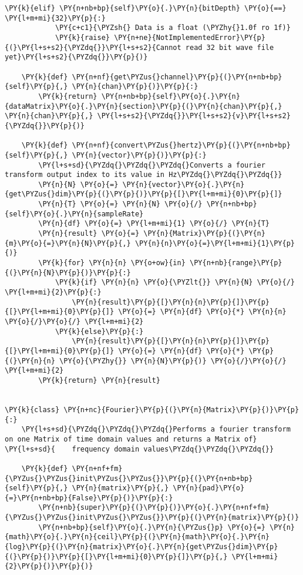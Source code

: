 \begin{Verbatim}[commandchars=\\\{\}]
        \PY{k}{elif} \PY{n+nb+bp}{self}\PY{o}{.}\PY{n}{bitDepth} \PY{o}{==} \PY{l+m+mi}{32}\PY{p}{:}
            \PY{c+c1}{\PYZsh{} Data is a float (\PYZhy{}1.0f ro 1f)}
            \PY{k}{raise} \PY{n+ne}{NotImplementedError}\PY{p}{(}\PY{l+s+s2}{\PYZdq{}}\PY{l+s+s2}{Cannot read 32 bit wave file yet}\PY{l+s+s2}{\PYZdq{}}\PY{p}{)}

    \PY{k}{def} \PY{n+nf}{get\PYZus{}channel}\PY{p}{(}\PY{n+nb+bp}{self}\PY{p}{,} \PY{n}{chan}\PY{p}{)}\PY{p}{:}
        \PY{k}{return} \PY{n+nb+bp}{self}\PY{o}{.}\PY{n}{dataMatrix}\PY{o}{.}\PY{n}{section}\PY{p}{(}\PY{n}{chan}\PY{p}{,} \PY{n}{chan}\PY{p}{,} \PY{l+s+s2}{\PYZdq{}}\PY{l+s+s2}{v}\PY{l+s+s2}{\PYZdq{}}\PY{p}{)}

    \PY{k}{def} \PY{n+nf}{convert\PYZus{}hertz}\PY{p}{(}\PY{n+nb+bp}{self}\PY{p}{,} \PY{n}{vector}\PY{p}{)}\PY{p}{:}
        \PY{l+s+sd}{\PYZdq{}\PYZdq{}\PYZdq{}Converts a fourier transform output index to its value in Hz\PYZdq{}\PYZdq{}\PYZdq{}}
        \PY{n}{N} \PY{o}{=} \PY{n}{vector}\PY{o}{.}\PY{n}{get\PYZus{}dim}\PY{p}{(}\PY{p}{)}\PY{p}{[}\PY{l+m+mi}{0}\PY{p}{]}
        \PY{n}{T} \PY{o}{=} \PY{n}{N} \PY{o}{/} \PY{n+nb+bp}{self}\PY{o}{.}\PY{n}{sampleRate}
        \PY{n}{df} \PY{o}{=} \PY{l+m+mi}{1} \PY{o}{/} \PY{n}{T}
        \PY{n}{result} \PY{o}{=} \PY{n}{Matrix}\PY{p}{(}\PY{n}{m}\PY{o}{=}\PY{n}{N}\PY{p}{,} \PY{n}{n}\PY{o}{=}\PY{l+m+mi}{1}\PY{p}{)}
        \PY{k}{for} \PY{n}{n} \PY{o+ow}{in} \PY{n+nb}{range}\PY{p}{(}\PY{n}{N}\PY{p}{)}\PY{p}{:}
            \PY{k}{if} \PY{n}{n} \PY{o}{\PYZlt{}} \PY{n}{N} \PY{o}{/} \PY{l+m+mi}{2}\PY{p}{:}
                \PY{n}{result}\PY{p}{[}\PY{n}{n}\PY{p}{]}\PY{p}{[}\PY{l+m+mi}{0}\PY{p}{]} \PY{o}{=} \PY{n}{df} \PY{o}{*} \PY{n}{n} \PY{o}{/}\PY{o}{/} \PY{l+m+mi}{2}
            \PY{k}{else}\PY{p}{:}
                \PY{n}{result}\PY{p}{[}\PY{n}{n}\PY{p}{]}\PY{p}{[}\PY{l+m+mi}{0}\PY{p}{]} \PY{o}{=} \PY{n}{df} \PY{o}{*} \PY{p}{(}\PY{n}{n} \PY{o}{\PYZhy{}} \PY{n}{N}\PY{p}{)} \PY{o}{/}\PY{o}{/} \PY{l+m+mi}{2}
        \PY{k}{return} \PY{n}{result}


\PY{k}{class} \PY{n+nc}{Fourier}\PY{p}{(}\PY{n}{Matrix}\PY{p}{)}\PY{p}{:}
    \PY{l+s+sd}{\PYZdq{}\PYZdq{}\PYZdq{}Performs a fourier transform on one Matrix of time domain values and returns a Matrix of}
\PY{l+s+sd}{    frequency domain values\PYZdq{}\PYZdq{}\PYZdq{}}

    \PY{k}{def} \PY{n+nf+fm}{\PYZus{}\PYZus{}init\PYZus{}\PYZus{}}\PY{p}{(}\PY{n+nb+bp}{self}\PY{p}{,} \PY{n}{matrix}\PY{p}{,} \PY{n}{pad}\PY{o}{=}\PY{n+nb+bp}{False}\PY{p}{)}\PY{p}{:}
        \PY{n+nb}{super}\PY{p}{(}\PY{p}{)}\PY{o}{.}\PY{n+nf+fm}{\PYZus{}\PYZus{}init\PYZus{}\PYZus{}}\PY{p}{(}\PY{n}{matrix}\PY{p}{)}
        \PY{n+nb+bp}{self}\PY{o}{.}\PY{n}{\PYZus{}p} \PY{o}{=} \PY{n}{math}\PY{o}{.}\PY{n}{ceil}\PY{p}{(}\PY{n}{math}\PY{o}{.}\PY{n}{log}\PY{p}{(}\PY{n}{matrix}\PY{o}{.}\PY{n}{get\PYZus{}dim}\PY{p}{(}\PY{p}{)}\PY{p}{[}\PY{l+m+mi}{0}\PY{p}{]}\PY{p}{,} \PY{l+m+mi}{2}\PY{p}{)}\PY{p}{)}
        

\end{Verbatim}
